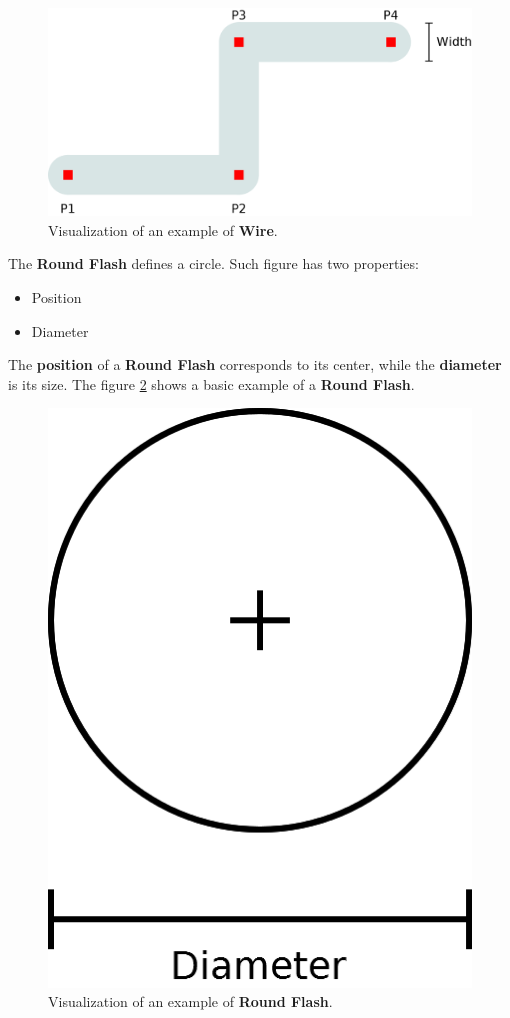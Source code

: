 \documentclass[11pt,twoside,openany,x11names,svgnames]{memoir}
\begin{document}
\begin{figure}
	\centering
	\label{fig:wire}
	\includegraphics[scale=0.2, clip=true, trim= 0pt 0pt 0pt 0pt]{images/chapter03-image05}
	\caption{Visualization of an example of \textbf{Wire}.}
\end{figure}

The \textbf{Round Flash} defines a circle. Such figure has two properties:

\begin{itemize}
\item Position
\item Diameter
\end{itemize}

The \textbf{position} of a \textbf{Round Flash} corresponds to its center, while the \textbf{diameter} is its size. The figure \ref{fig:roundflash} shows a basic example of a \textbf{Round Flash}.

\begin{figure}
	\centering
	\label{fig:roundflash}
	\includegraphics[scale=0.2, clip=true, trim= 0pt 0pt 0pt 0pt]{images/chapter03-image06}
	\caption{Visualization of an example of \textbf{Round Flash}.}
\end{figure}
\end{document}
